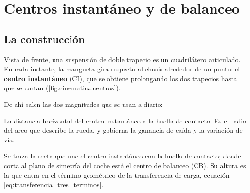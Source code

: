 \section{Centros instantáneo y de balanceo}
\label{sec:cinematica_suspension:01}

\subsection{La construcción}

Vista de frente, una suspensión de doble trapecio es un cuadrilátero
articulado. En cada instante, la mangueta gira respecto al chasis alrededor de
un punto: el \textbf{centro instantáneo} (CI), que se obtiene prolongando los
dos trapecios hasta que se cortan (\cref{fig:cinematica:centros}).

De ahí salen las dos magnitudes que se usan a diario:

\begin{description}[leftmargin=0pt,labelsep=0pt,style=nextline]
  \item[Brazo oscilante virtual] La distancia horizontal del centro instantáneo
    a la huella de contacto. Es el radio del arco que describe la rueda, y
    gobierna la ganancia de caída y la variación de vía.
  \item[Centro de balanceo] Se traza la recta que une el centro instantáneo con
    la huella de contacto; donde corta al plano de simetría del coche está el
    centro de balanceo (CB). Su altura es la que entra en el término geométrico
    de la transferencia de carga, ecuación
    \eqref{eq:transferencia_tres_terminos}.
\end{description}


